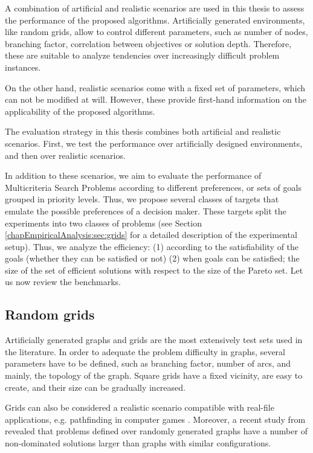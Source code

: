 A combination of artificial and realistic scenarios are used in this thesis to assess the performance of the proposed algorithms. Artificially generated environments, like random grids, allow to control different parameters, such as number of nodes, branching factor, correlation between objectives or solution depth. Therefore, these are suitable to analyze tendencies over increasingly difficult problem instances. 

On the other hand, realistic scenarios come with a fixed set of parameters, which can not be modified at will. However, these provide first-hand information on the applicability of the proposed algorithms. 

The evaluation strategy in this thesis combines both artificial and realistic scenarios. First, we test the performance over artificially designed environments, and then over realistic scenarios.

In addition to these scenarios, we aim to evaluate the performance of Multicriteria Search Problems according to different preferences, or sets of goals grouped in priority levels. Thus, we propose several classes of targets that emulate the possible preferences of a decision maker. These targets split the experiments into two classes of problems (see Section \ref{chapEmpiricalAnalysis:sec:grids} for a detailed description of the experimental setup). Thus, we analyze the efficiency: (1) according to the satisfiability of the goals (whether they can be satisfied or not) (2) when goals can be satisfied; the size of the set of efficient solutions with respect to the size of the Pareto set. Let us now review the benchmarks.

\subsection{Random grids}
\label{chapMultiObjTestBeds:subsec:RandomGrids}

Artificially generated graphs and grids are the most extensively test sets used in the literature. In order to adequate the problem difficulty in graphs, several parameters have to be defined, such as branching factor, number of arcs, and mainly, the topology of the graph. Square grids have a fixed vicinity, are easy to create, and their size can be gradually increased.  

Grids can also be considered a realistic scenario compatible with real-file applications, e.g. pathfinding in computer games \citep{bayilipolat2011}. Moreover, a recent study from \citet{paixaosantos2008} revealed that problems defined over randomly generated graphs have a number of non-dominated solutions larger than graphs with similar configurations.

